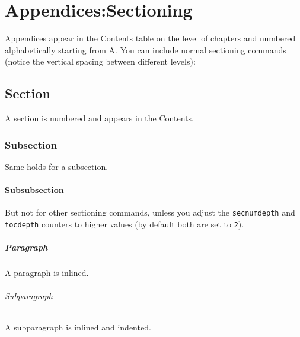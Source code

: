 
%
%

\chapter{Appendices:Sectioning}\label{app:spacing}

Appendices appear in the Contents table on the level of chapters and
numbered alphabetically starting from A. You can include normal
sectioning commands (notice the vertical spacing between different
levels):

\section{Section}
A section is numbered and appears in the Contents.

\subsection{Subsection}
Same holds for a subsection.

\subsubsection{Subsubsection}
But not for other sectioning commands, unless you adjust the
\verb+secnumdepth+ and
\verb+tocdepth+
counters to higher values (by default both are set to \texttt{2}).

\paragraph{Paragraph}
A paragraph is inlined.

\subparagraph{Subparagraph}
A subparagraph is inlined and indented.



